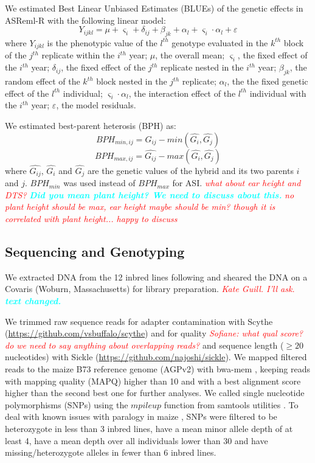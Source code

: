 \documentclass[9pt,twocolumn,twoside]{gsajnl}
\newcommand{\yang}[1]{\textcolor{cyan}{\emph{\bf  #1}} }
\newcommand{\jri}[1]{\textcolor{red}{ \emph{ #1}} }
\begin{document}
We estimated Best Linear Unbiased Estimates (BLUEs) of the genetic effects in ASReml-R \citep{gilmour2009asreml} with the following linear model: 
\[Y_{ijkl} = \mu + \varsigma_{i} + \delta_{ij} + \beta_{jk} + \alpha_{l} +  \varsigma_{i} \cdot \alpha_{l} + \varepsilon\]
where 
$Y_{ijkl}$ is the phenotypic value of the $l^{th}$ genotype evaluated in the $k^{th}$ block of the $j^{th}$ replicate within the $i^{th}$ year; 
$\mu$, the overall mean; 
$\varsigma_{i}$, the fixed effect of the $i^{th}$ year;
$\delta_{ij}$, the fixed effect of the $j^{th}$ replicate nested in the $i^{th}$ year; 
$\beta_{jk}$, the random effect of the $k^{th}$ block nested in the $j^{th}$ replicate; 
$\alpha_{l}$, the the fixed genetic effect  of the $l^{th}$ individual; 
$\varsigma_{i} \cdot \alpha_{l}$, the interaction effect of the $l^{th}$ individual with the $i^{th}$ year; 
$\varepsilon$, the model residuals. 

We estimated best-parent heterosis (BPH) as:
\[ BPH_{min,ij}=\hat{G_{ij}}-min(\hat{G_{i}} ,\hat{G_{j}}) \] 
\[ BPH_{max,ij}=\hat{G_{ij}}-max(\hat{G_{i}} ,\hat{G_{j}}) \]
where $\hat{G_{ij}}$, $\hat{G_{i}}$ and $\hat{G_{j}}$ are the genetic values of the hybrid and its two parents $i$ and $j$. $BPH_{min}$ was used instead of $BPH_{max}$ for ASI. \jri{what about ear height and DTS?} \yang{Did you mean plant height? We need to discuss about this.} \DIFaddbegin \jri{no plant height should be max, ear height maybe should be min? though it is correlated with plant height... happy to discuss}
\DIFaddend 

\subsection*{Sequencing and Genotyping}

We extracted DNA from the 12 inbred lines following \citet{Doyle1987} and sheared the DNA on a Covaris (Woburn, Massachusetts) for library preparation. \DIFdelbegin {}\DIFdelend \DIFaddbegin {}\jri{Kate Guill. I'll ask.} \yang{text changed.}
\DIFaddend 

We trimmed raw sequence reads for adapter contamination with Scythe  (\url{https://github.com/vsbuffalo/scythe}) and for quality \DIFaddbegin \jri{Sofiane: what qual score? do we need to say anything about overlapping reads?} \DIFaddend and sequence length ($\geq 20$ nucleotides) with Sickle (\url{https://github.com/najoshi/sickle}). 
We mapped filtered reads to the maize B73 reference genome (AGPv2) with bwa-mem \citep{Li2009B}, keeping reads with mapping quality (MAPQ) higher than 10 and with a best alignment score higher than the second best one for further analyses.
We called single nucleotide polymorphisms (SNPs) using the $mpileup$ function from \DIFaddbegin {}\DIFaddend samtools utilities \citep{Li2009}. 
To deal with known issues with paralogy in maize \citep{Chia2012}, SNPs were filtered to be heterozygote in less than 3 inbred lines, have a mean minor allele depth of at least 4, have a mean depth over all individuals lower than 30 and have missing/heterozygote alleles in fewer than 6 inbred lines. 
\end{document}

